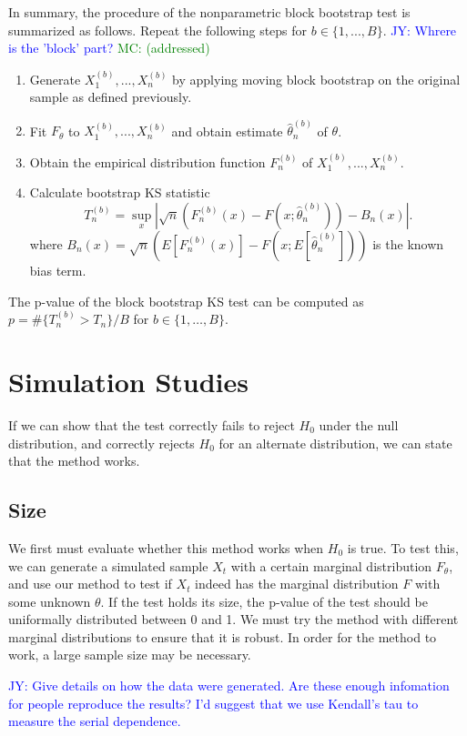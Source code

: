 \documentclass[12pt, titlepage, letterpaper]{article}
\newcommand{\jy}[1]{\textcolor{blue}{JY: #1}}
\newcommand{\mc}[1]{\textcolor{green}{MC: (#1)}}
\begin{document}
{In summary, the procedure of the nonparametric block bootstrap test is 
summarized as follows. Repeat the following steps for $b \in \{1, ..., B\}$.
\jy{Whrere is the 'block' part?}
\mc{addressed}
\begin{enumerate}
\item
  Generate $X^{(b)}_1,...,X^{(b)}_n$ by applying moving block bootstrap 
  on the original sample as
  defined previously.
\item
  Fit $F_\theta$ to $X^{(b)}_1,...,X^{(b)}_n$ and obtain estimate 
	$\hat\theta^{(b)}_n$ of $\theta$.
\item
  Obtain the empirical distribution function $F^{(b)}_n$ of
  $X^{(b)}_1,...,X^{(b)}_n$. 
\item
  Calculate bootstrap KS statistic
  \[
    T^{(b)}_n = \sup_x | \sqrt{n}\left(F^{(b)}_n(x) 
    - F(x; \hat\theta^{(b)}_n)\right) - B_n(x) |.
  \]
  where 
  $B_{n}(x) = \sqrt{n}(E[F^{(b)}_n(x)] - 
  F(x; E[\hat\theta^{(b)}_n]))$ is the known
  bias term.
\end{enumerate}


The p-value of the block bootstrap KS test can be computed
as $p = \#\{T^{(b)}_n > T_n\} / B$ for 
$b \in \{1, \ldots, B\}$.

\section{Simulation Studies}
\label{sec:simu}

If we can show that the test correctly fails to reject $H_0$ under the null
distribution, and correctly rejects $H_0$ for an alternate distribution, we can
state that the method works.


\subsection{Size}
We first must evaluate whether this method works when $H_0$ is true. To
test this, we can
generate a simulated sample $X_t$ with a certain marginal distribution 
$F_\theta$,
and use our method to test if $X_t$ indeed has the marginal distribution $F$ 
with some unknown $\theta$. If the test holds its size, the 
p-value
of the test should be uniformally distributed between 0 and 1. We must try the
method with different marginal distributions to ensure that it is robust.
In order for the method to work, a large sample size may be necessary. 


\jy{Give details on how the data were generated. Are these enough infomation for
  people reproduce the results? I'd suggest that we use Kendall's tau to measure
  the serial dependence. }


}
\end{document}
